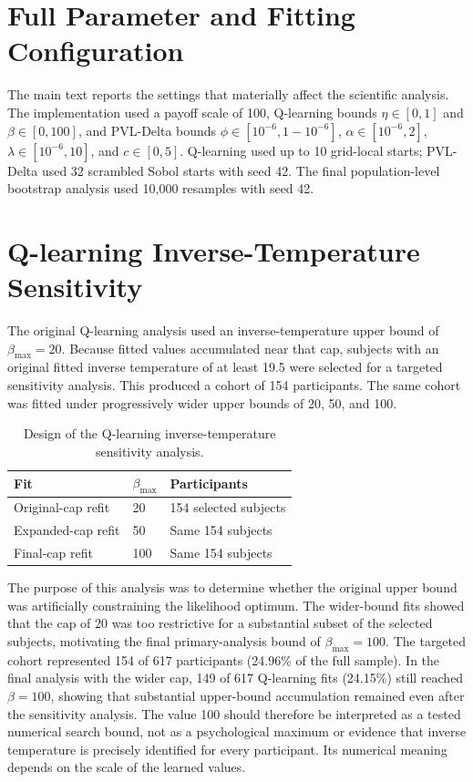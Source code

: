 \section{Full Parameter and Fitting Configuration}
The main text reports the settings that materially affect the scientific analysis. The implementation used a payoff scale of 100, Q-learning bounds \(\eta\in[0,1]\) and \(\beta\in[0,100]\), and PVL-Delta bounds \(\phi\in[10^{-6},1-10^{-6}]\), \(\alpha\in[10^{-6},2]\), \(\lambda\in[10^{-6},10]\), and \(c\in[0,5]\). Q-learning used up to 10 grid-local starts; PVL-Delta used 32 scrambled Sobol starts with seed 42. The final population-level bootstrap analysis used 10,000 resamples with seed 42.

\section{Q-learning Inverse-Temperature Sensitivity}
The original Q-learning analysis used an inverse-temperature upper bound of \(\beta_{\max}=20\). Because fitted values accumulated near that cap, subjects with an original fitted inverse temperature of at least 19.5 were selected for a targeted sensitivity analysis. This produced a cohort of 154 participants. The same cohort was fitted under progressively wider upper bounds of 20, 50, and 100.

\begin{table}[H]
    \centering
    \caption{Design of the Q-learning inverse-temperature sensitivity analysis.}\label{tab:beta-sensitivity}
    \begin{tabular}{@{}lll@{}}
        \toprule
        Fit                & \(\beta_{\max}\) & Participants          \\
        \midrule
        Original-cap refit & 20               & 154 selected subjects \\
        Expanded-cap refit & 50               & Same 154 subjects     \\
        Final-cap refit    & 100              & Same 154 subjects     \\
        \bottomrule
    \end{tabular}
\end{table}

The purpose of this analysis was to determine whether the original upper bound was artificially constraining the likelihood optimum. The wider-bound fits showed that the cap of 20 was too restrictive for a substantial subset of the selected subjects, motivating the final primary-analysis bound of \(\beta_{\max}=100\). The targeted cohort represented 154 of 617 participants (24.96\% of the full sample). In the final analysis with the wider cap, 149 of 617 Q-learning fits (24.15\%) still reached \(\beta=100\), showing that substantial upper-bound accumulation remained even after the sensitivity analysis. The value 100 should therefore be interpreted as a tested numerical search bound, not as a psychological maximum or evidence that inverse temperature is precisely identified for every participant. Its numerical meaning depends on the scale of the learned values.


